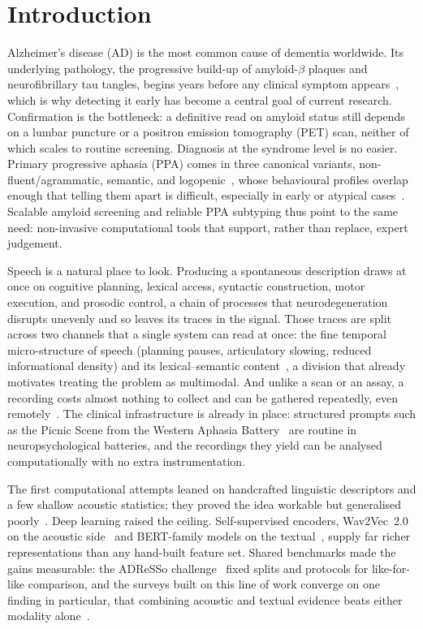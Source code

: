 \clearpage
\newpage
\section{Introduction}

Alzheimer's disease (AD) is the most common cause of dementia worldwide. Its underlying pathology, the progressive build-up of amyloid-$\beta$ plaques and neurofibrillary tau tangles, begins years before any clinical symptom appears~\cite{hardy1992amyloid}, which is why detecting it early has become a central goal of current research. Confirmation is the bottleneck: a definitive read on amyloid status still depends on a lumbar puncture or a positron emission tomography (PET) scan, neither of which scales to routine screening. Diagnosis at the syndrome level is no easier. Primary progressive aphasia (PPA) comes in three canonical variants, non-fluent/agrammatic, semantic, and logopenic~\cite{gorno2011ppa,gorno2015ppa}, whose behavioural profiles overlap enough that telling them apart is difficult, especially in early or atypical cases~\cite{elahi2017clinicopath}. Scalable amyloid screening and reliable PPA subtyping thus point to the same need: non-invasive computational tools that support, rather than replace, expert judgement.

Speech is a natural place to look. Producing a spontaneous description draws at once on cognitive planning, lexical access, syntactic construction, motor execution, and prosodic control, a chain of processes that neurodegeneration disrupts unevenly and so leaves its traces in the signal. Those traces are split across two channels that a single system can read at once: the fine temporal micro-structure of speech (planning pauses, articulatory slowing, reduced informational density) and its lexical--semantic content~\cite{lima2025communicationsmedicine}, a division that already motivates treating the problem as multimodal. And unlike a scan or an assay, a recording costs almost nothing to collect and can be gathered repeatedly, even remotely~\cite{rezaii2025voiceprints}. The clinical infrastructure is already in place: structured prompts such as the Picnic Scene from the Western Aphasia Battery~\cite{kertesz1982wab} are routine in neuropsychological batteries, and the recordings they yield can be analysed computationally with no extra instrumentation.

The first computational attempts leaned on handcrafted linguistic descriptors and a few shallow acoustic statistics; they proved the idea workable but generalised poorly~\cite{fraser2016linguistic}. Deep learning raised the ceiling. Self-supervised encoders, Wav2Vec~2.0 on the acoustic side~\cite{baevski2020wav2vec} and BERT-family models on the textual~\cite{devlin2019bert}, supply far richer representations than any hand-built feature set. Shared benchmarks made the gains measurable: the ADReSSo challenge~\cite{luz2021adresso} fixed splits and protocols for like-for-like comparison, and the surveys built on this line of work converge on one finding in particular, that combining acoustic and textual evidence beats either modality alone~\cite{ding2024speechsurvey}.

